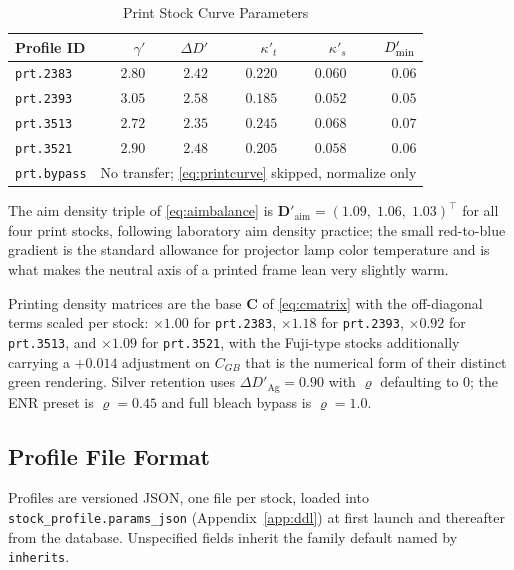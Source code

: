 \begin{table}[htbp]
\caption{Print Stock Curve Parameters}
\label{tab:printparams}
\begin{center}
\renewcommand{\arraystretch}{1.15}
\footnotesize
\begin{tabular}{@{}lrrrrr@{}}
\toprule
\textbf{Profile ID} & $\gamma'$ & $\Delta D'$ & $\kappa'_t$ & $\kappa'_s$ & $D_{\min}'$ \\
\midrule
\texttt{prt.2383}   & $2.80$ & $2.42$ & $0.220$ & $0.060$ & $0.06$ \\
\texttt{prt.2393}   & $3.05$ & $2.58$ & $0.185$ & $0.052$ & $0.05$ \\
\texttt{prt.3513}   & $2.72$ & $2.35$ & $0.245$ & $0.068$ & $0.07$ \\
\texttt{prt.3521}   & $2.90$ & $2.48$ & $0.205$ & $0.058$ & $0.06$ \\
\texttt{prt.bypass} & \multicolumn{5}{l}{No transfer; \eqref{eq:printcurve} skipped, normalize only} \\
\bottomrule
\end{tabular}
\end{center}
\end{table}

The aim density triple of \eqref{eq:aimbalance} is
$\mathbf{D}'_{\mathrm{aim}} = (1.09,\; 1.06,\; 1.03)^\top$ for all four print
stocks, following laboratory aim density practice; the small red-to-blue
gradient is the standard allowance for projector lamp color temperature and is
what makes the neutral axis of a printed frame lean very slightly warm.

Printing density matrices are the base $\mathbf{C}$ of \eqref{eq:cmatrix} with
the off-diagonal terms scaled per stock: $\times 1.00$ for \texttt{prt.2383},
$\times 1.18$ for \texttt{prt.2393}, $\times 0.92$ for \texttt{prt.3513}, and
$\times 1.09$ for \texttt{prt.3521}, with the Fuji-type stocks additionally
carrying a $+0.014$ adjustment on $C_{GB}$ that is the numerical form of their
distinct green rendering. Silver retention uses $\Delta D'_{\mathrm{Ag}} =
0.90$ with $\varrho$ defaulting to $0$; the ENR preset is $\varrho = 0.45$ and
full bleach bypass is $\varrho = 1.0$.

\subsection{Profile File Format}

Profiles are versioned JSON, one file per stock, loaded into
\texttt{stock\_profile.params\_json} (Appendix~\ref{app:ddl}) at first launch
and thereafter from the database. Unspecified fields inherit the family
default named by \texttt{inherits}.

